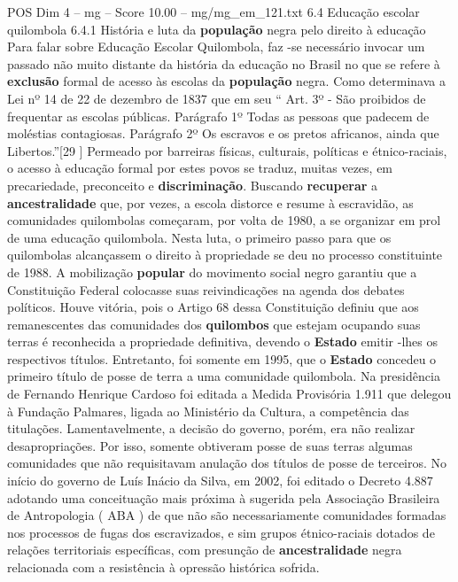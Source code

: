 \begin{textsample}{POS Dim 4 – mg – Score 10.00 – mg/mg\_em\_121.txt}  \label{ex:f4_pos_197}
6.4 Educação escolar quilombola 6.4.1 História e luta da \textbf{população} negra pelo direito à educação Para falar sobre Educação Escolar Quilombola, faz -se necessário invocar um passado não muito distante da história da educação no Brasil no que se refere à \textbf{exclusão} formal de acesso às escolas da \textbf{população} negra.
Como determinava a Lei nº 14 de 22 de dezembro de 1837 que em seu “ Art. 3º - São proibidos de frequentar as escolas públicas.
Parágrafo 1º Todas as pessoas que padecem de moléstias contagiosas.
Parágrafo 2º Os escravos e os pretos africanos, ainda que Libertos.”[29 ] Permeado por barreiras físicas, culturais, políticas e étnico-raciais, o acesso à educação formal por estes povos se traduz, muitas vezes, em precariedade, preconceito e \textbf{discriminação}.
Buscando \textbf{recuperar} a \textbf{ancestralidade} que, por vezes, a escola distorce e resume à escravidão, as comunidades quilombolas começaram, por volta de 1980, a se organizar em prol de uma educação quilombola.
Nesta luta, o primeiro passo para que os quilombolas alcançassem o direito à propriedade se deu no processo constituinte de 1988.
A mobilização \textbf{popular} do movimento social negro garantiu que a Constituição Federal colocasse suas reivindicações na agenda dos debates políticos.
Houve vitória, pois o Artigo 68 dessa Constituição definiu que aos remanescentes das comunidades dos \textbf{quilombos} que estejam ocupando suas terras é reconhecida a propriedade definitiva, devendo o \textbf{Estado} emitir -lhes os respectivos títulos.
Entretanto, foi somente em 1995, que o \textbf{Estado} concedeu o primeiro título de posse de terra a uma comunidade quilombola.
Na presidência de Fernando Henrique Cardoso foi editada a Medida Provisória 1.911 que delegou à Fundação Palmares, ligada ao Ministério da Cultura, a competência das titulações.
Lamentavelmente, a decisão do governo, porém, era não realizar desapropriações.
Por isso, somente obtiveram posse de suas terras algumas comunidades que não requisitavam anulação dos títulos de posse de terceiros.
No início do governo de Luís Inácio da Silva, em 2002, foi editado o Decreto 4.887 adotando uma conceituação mais próxima à sugerida pela Associação Brasileira de Antropologia ( ABA ) de que não são necessariamente comunidades formadas nos processos de fugas dos escravizados, e sim grupos étnico-raciais dotados de relações territoriais específicas, com presunção de \textbf{ancestralidade} negra relacionada com a resistência à opressão histórica sofrida.

\end{textsample}
